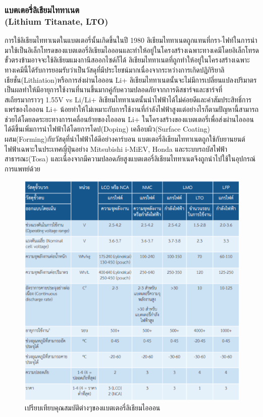 \subsubsection*{แบตเตอรี่ลิเธียมไททาเนต\\ (Lithium Titanate, LTO)}
	การใช้ลิเธียมไททาเนตในแบตเตอรี่นั้นเกิดขึ้นในปี 1980 ลิเธียมไททาเนตถูกแทนที่กรา-ไฟท์ในการนำมาใช้เป็นอิเล็กโทรดของแบตเตอรี่ลิเธียมไอออนและทำให้อยู่ในโครงสร้างเฉพาะทางเคมีโดยอิเล็กโทรดขั้วตรงข้ามอาจจะใช้ลิเธียมแมงกานีสออกไซด์ก็ได้ ลิเธียมไททาเนตที่ถูกทำให้อยู่ในโครงสร้างเฉพาะทางเคมีนี้ได้รับการยอมรับว่าเป็นวัสดุที่มีประโยชน์มากเนื่องจากระหว่างการเกิดปฏิกิริยาลิเธียชั่น(Lithiation)หรือการส่งผ่านไอออน Li+ ลิเธียมไททาเนตนั้นจะไม่มีการเปลี่ยนแปลงปริมาตรเป็นผลทำให้มีอายุการใช้งานที่นานขึ้นมากคู่กับความปลอดภัยจากการดิสชาร์จและชาร์จที่\\สเถียรมากราวๆ 1.55V vs Li/Li+ ลิเธียมไททาเนตนั้นนำไฟฟ้าได้ไม่ค่อยดีและค่าสัมประสิทธิ์การแพร่ของไอออน Li+ น้อยทำให้ไม่เหมาะกับการใช้งานที่กำลังไฟฟ้าสูงแต่อย่างไรก็ตามปัญหานี้สามารถช่วยได้โดยลดระยะทางการเคลื่อนย้ายของไอออน Li+ ในโครงสร้างของแบตเตอรี่เพื่อส่งผ่านไอออนได้ดีขึ้นเพิ่มการนำไฟฟ้าได้โดยการโดป(Doping) เคลือบผิว(Surface Coating) ผสม(Forming)กับวัสดุที่นำไฟฟ้าได้ดีอย่างคาร์บอน
\newline\hspace*{2cm}
แบตเตอรี่ลิเธียมไททาเนตถูกใช้กับยานยนต์ไฟฟ้าเฉพาะในประเทศญี่ปุ่นอย่าง Mitsubishi i-MiEV, Honda และระบบรถบัสไฟฟ้าสาธารณะ(Tosa) และเนื่องจากมีความปลอดภัยสูงแบตเตอรี่ลิเธียมไททาเนตจึงถูกนำไปใช้ในอุปกรณ์การแพทย์ด้วย
\begin{center}
	\begin{figure}[H]
		\includegraphics[width=1\linewidth]{Chapters/img/Compare_Spec_Batteries.png}
			\centering
			\captionsetup{justification=centering,margin=2cm}
			\caption{เปรียบเทียบคุณสมบัติต่างๆของแบตเตอรี่ลิเธียมไอออน}
	\end{figure}
\end{center}
